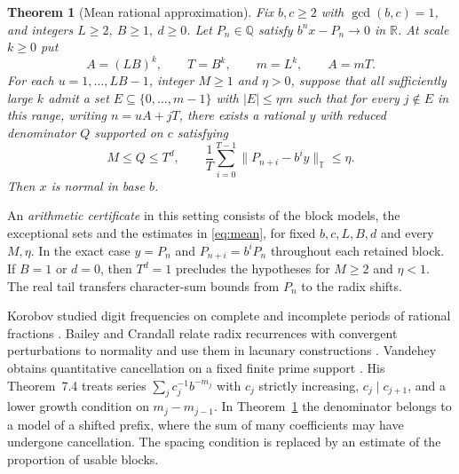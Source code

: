 \documentclass[11pt]{article}
\newtheorem{theorem}{Theorem}
\newcommand{\R}{\mathbb R}
\newcommand{\Q}{\mathbb Q}
\newcommand{\T}{\mathbb T}
\newcommand{\circabs}[1]{\lVert #1\rVert_{\T}}
\begin{document}
\begin{theorem}[Mean rational approximation]\label{thm:mean}
Fix \(b,c\ge2\) with \(\gcd(b,c)=1\), and integers \(L\ge2,\ B\ge1,\ d\ge0\). Let \(P_n\in\Q\) satisfy \(b^nx-P_n\to0\) in \(\R\). At scale \(k\ge0\) put
\[
 A=(LB)^k,\qquad T=B^k,\qquad m=L^k,\qquad A=mT.
\]
For each \(u=1,\ldots,LB-1\), integer \(M\ge1\) and \(\eta>0\), suppose that all sufficiently large \(k\) admit a set \(E\subseteq\{0,\ldots,m-1\}\) with \(|E|\le\eta m\) such that for every \(j\notin E\) in this range, writing \(n=uA+jT\), there exists a rational \(y\) with reduced denominator \(Q\) supported on \(c\) satisfying
\begin{equation}\label{eq:mean}
 M\le Q\le T^d,\qquad
 \frac1T\sum_{i=0}^{T-1}\circabs{P_{n+i}-b^i y}\le\eta .
\end{equation}
Then \(x\) is normal in base \(b\).
\end{theorem}

An \emph{arithmetic certificate} in this setting consists of the block models, the exceptional sets and the estimates in \eqref{eq:mean}, for fixed \(b,c,L,B,d\) and every \(M,\eta\). In the exact case \(y=P_n\) and \(P_{n+i}=b^iP_n\) throughout each retained block. If \(B=1\) or \(d=0\), then \(T^d=1\) precludes the hypotheses for \(M\ge2\) and \(\eta<1\). The real tail transfers character-sum bounds from \(P_n\) to the radix shifts.

Korobov studied digit frequencies on complete and incomplete periods of rational fractions \cite{korobov}. Bailey and Crandall relate radix recurrences with convergent perturbations to normality and use them in lacunary constructions \cite{bailey}. Vandehey obtains quantitative cancellation on a fixed finite prime support \cite[Cor.~1.2]{vandehey}. His Theorem~7.4 treats series \(\sum_j c_j^{-1}b^{-m_j}\) with \(c_j\) strictly increasing, \(c_j\mid c_{j+1}\), and a lower growth condition on \(m_j-m_{j-1}\). In Theorem~\ref{thm:mean} the denominator belongs to a model of a shifted prefix, where the sum of many coefficients may have undergone cancellation. The spacing condition is replaced by an estimate of the proportion of usable blocks.
\end{document}
